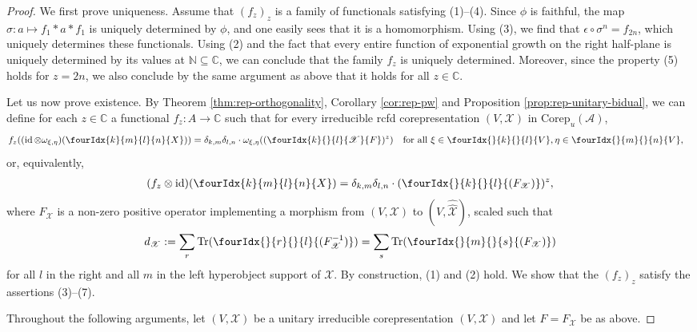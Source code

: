 \documentclass[11pt]{article}
\DeclareMathOperator{\id}{id}
\newcommand{\dualco}[1]{\hat{#1}}
\newcommand{\Corep}{\mathrm{Corep}}
\newcommand{\C}{\mathbb{C}}
\newcommand{\N}{\mathbb{N}}
\newcommand{\Tr}{\mathrm{Tr}}
\newcommand{\Gr}[5]{\fourIdx{#2}{#4}{#3}{#5}{#1}}%
\newcommand{\Gru}[3]{\Gr{#1}{}{}{#2}{#3}}
\theoremstyle{definition}
\numberwithin{equation}{section}
\begin{document}
\begin{proof}
  We first prove uniqueness.  Assume that $(f_{z})_{z}$ is a family of
  functionals satisfying (1)--(4).  Since $\phi$ is faithful, the map
  $\sigma\colon a \mapsto f_{1} \ast a \ast f_{1}$ is uniquely
  determined by $\phi$, and one easily sees that it is a homomorphism. Using
  (3), we find that $\epsilon \circ \sigma^n=f_{2n}$, which uniquely determines these functionals. Using (2) and the
  fact that every entire function of exponential growth on the right
  half-plane is uniquely determined by its values at $\N \subseteq \C$, we can conclude that the family $f_{z}$ is uniquely determined. Moreover, since the property (5) holds for $z = 2n$, we also conclude by the same argument as above that it holds for all $z\in \C$.

  Let us now prove existence.  By Theorem \ref{thm:rep-orthogonality}, Corollary \ref{cor:rep-pw} and Proposition \ref{prop:rep-unitary-bidual}, we can
  define for each $z\in \C$ a functional $f_{z} \colon A \to \C$ such
  that for every 
  irreducible rcfd corepresentation
  $(V,\mathscr{X})$ in $\Corep_{u}(\mathscr{A})$,
    \begin{align*}
      f_{z}((\id \otimes \omega_{\xi,\eta})(\Gr{X}{k}{l}{m}{n})) &=
      \delta_{k,m}\delta_{l,n} \cdot
      \omega_{\xi,\eta}((\Gr{F}{k}{l}{}{\mathscr{X}})^{z}) \quad \text{for all }
      \xi \in \Gru{V}{k}{l},\eta \in
      \Gru{V}{m}{n},
    \end{align*}
    or, equivalently,
    \begin{align*}
      (f_{z} \otimes \id)(\Gr{X}{k}{l}{m}{n}) =
      \delta_{k,m}\delta_{l,n} \cdot (\Gru{(F_{\mathscr{X}})}{k}{l})^{z},
    \end{align*}
    where $F_{\mathscr{X}}$ is a non-zero positive operator implementing a morphism from $(V,\mathscr{X})$ to
    $(V, \dualco{\dualco{\mathscr{X}}})$, scaled such that
    \begin{align*}
      d_{\mathscr{X}}:= \sum_{r} \Tr(\Gru{(F_{\mathscr{X}}^{-1})}{r}{l}) = \sum_{s}
      \Tr(\Gru{(F_{\mathscr{X}})}{m}{s})
    \end{align*}
    for all $l$ in the right and all $m$ in the left hyperobject support of $\mathscr{X}$. By
    construction, (1) and (2) hold. We show that the $(f_{z})_{z}$ satisfy the
    assertions (3)--(7). 

        Throughout the following arguments, let 
    $(V,\mathscr{X})$ be a unitary irreducible corepresentation
    $(V,\mathscr{X})$ and let $F=F_{\mathscr{X}}$ be as above.


\end{proof}
\end{document}
